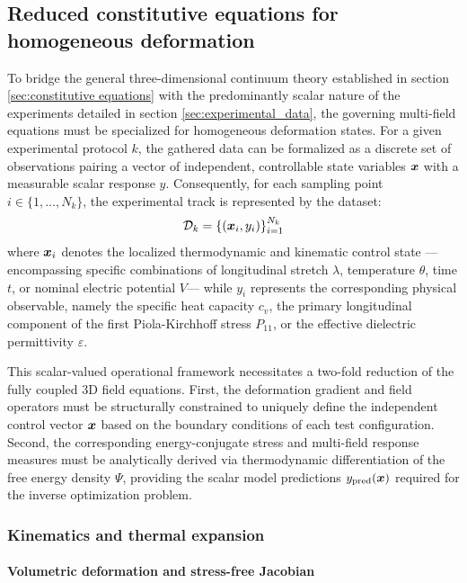 \subsection{Reduced constitutive equations for homogeneous deformation}
\label{sec:reduced_equations}

To bridge the general three-dimensional continuum theory established in section \ref{sec:constitutive equations} with the predominantly scalar nature of the experiments detailed in section \ref{sec:experimental_data}, the governing multi-field equations must be specialized for homogeneous deformation states. For a given experimental protocol $k$, the gathered data can be formalized as a discrete set of observations pairing a vector of independent, controllable state variables $\boldsymbol{x}$ with a measurable scalar response $y$. Consequently, for each sampling point $i \in \{1, \dots, N_k\}$, the experimental track is represented by the dataset:
%
\begin{equation}
    \mathcal{D}_k = \left\{ (\boldsymbol{x}_i, y_i) \right\}_{i=1}^{N_k}
\end{equation}
%
where $\boldsymbol{x}_i$ denotes the localized thermodynamic and kinematic control state —encompassing specific combinations of longitudinal stretch $\lambda$, temperature $\theta$, time $t$, or nominal electric potential $V$— while $y_i$ represents the corresponding physical observable, namely the specific heat capacity $c_v$, the primary longitudinal component of the first Piola-Kirchhoff stress $P_{11}$, or the effective dielectric permittivity $\varepsilon$.

This scalar-valued operational framework necessitates a two-fold reduction of the fully coupled 3D field equations. First, the deformation gradient and field operators must be structurally constrained to uniquely define the independent control vector $\boldsymbol{x}$ based on the boundary conditions of each test configuration. Second, the corresponding energy-conjugate stress and multi-field response measures must be analytically derived via thermodynamic differentiation of the free energy density $\Psi$, providing the scalar model predictions $y_{\text{pred}}(\boldsymbol{x})$ required for the inverse optimization problem.



\subsubsection{Kinematics and thermal expansion}

\paragraph{Volumetric deformation and stress-free Jacobian}

